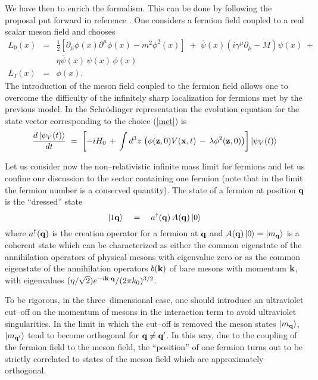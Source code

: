 \documentclass[12pt]{article}
\begin{document}
We have then to enrich the formalism. This can be done by
following the proposal put forward in reference \cite{p62}. One
considers a fermion field coupled to a real scalar meson field and
chooses
\begin{eqnarray} \label{mct}
L_{0}(x) & = & \frac{1}{2}\left[ \partial_{\mu}\phi(x)
\partial^{\mu}\phi(x) - m^{2}\phi^{2}(x)\right] \; + \;
\overline{\psi}(x)\left( i\gamma^{\mu}\partial_{\mu} -
M\right)\psi(x) \; +
\nonumber \\
& &
\eta \overline{\psi}(x)\,\psi(x)\,\phi(x) \nonumber \\
L_{I}(x) & = & \phi(x).
\end{eqnarray}
The introduction of the meson field coupled to the fermion field
allows one to overcome the difficulty of the infinitely sharp
localization for fermions met by the previous model. In the
Schr\"odinger representation the evolution equation for the state
vector corresponding to the choice (\ref{mct}) is
\begin{equation} \label{mtre}
\frac{d\,|\psi_{V}(t)\rangle}{dt}\; = \; \left[ -i H_{0}\, + \,
\int d^{3}z\, \left( \phi({\bf z}, 0) V({\bf x}, t) \, - \,
\lambda \phi^{2}({\bf z}, 0) \right)\right] |\psi_{V}(t)\rangle
\end{equation}

Let us consider now the non--relativistic infinite mass limit for
fermions and let us confine our discussion to the sector
containing one fermion (note that in the limit the fermion number
is a conserved quantity). The state of a fermion at position ${\bf
q}$ is the ``dressed'' state
\begin{equation}
|1{\bf q}\rangle \quad = \quad a^{\dagger}({\bf q})\, A({\bf q})\,
|0\rangle
\end{equation}
where $a^{\dagger}({\bf q})$ is the creation operator for a
fermion at ${\bf q}$ and $A({\bf q})\, |0\rangle = |m_{\bf
q}\rangle$ is a coherent state which can be characterized as
either the common eigenstate of the annihilation operators of
physical mesons with eigenvalue zero or as the common eigenstate
of the annihilation operators $b({\bf k})$ of bare mesons with
momentum ${\bf k}$, with eigenvalues $(\eta/\sqrt{2})e^{-i{\bf
k}\cdot {\bf q}}/(2\pi k_{0})^{3/2}$.

To be rigorous, in the three--dimensional case, one should
introduce an ultraviolet cut--off on the momentum of mesons in the
interaction term to avoid ultraviolet singularities. In the limit
in which the cut--off is removed the meson states $|m_{\bf
q}\rangle$, $|m_{{\bf q}'}\rangle$ tend to become orthogonal for
${\bf q} \neq {\bf q}'$. In this way, due to the coupling of the
fermion field to the meson field, the ``position'' of one fermion
turns out to be strictly correlated to states of the meson field
which are approximately orthogonal.
\end{document}

